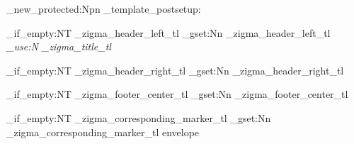 \cs_new_protected:Npn \zigma_template_postsetup:
  {
    \tl_if_empty:NT \g_zigma_header_left_tl
      {
        \tl_gset:Nn \g_zigma_header_left_tl 
          { 
            \small\itshape
            \tl_use:N \g_zigma_title_tl 
          }
      }
    
    \tl_if_empty:NT \g_zigma_header_right_tl
      {
        \tl_gset:Nn \g_zigma_header_right_tl { \thepage }
      }
    
    \tl_if_empty:NT \g_zigma_footer_center_tl
      {
        \tl_gset:Nn \g_zigma_footer_center_tl { }
      }
    
    \tl_if_empty:NT \g_zigma_corresponding_marker_tl
      {
        \tl_gset:Nn \g_zigma_corresponding_marker_tl { envelope }
      }
  }

\ExplSyntaxOff

